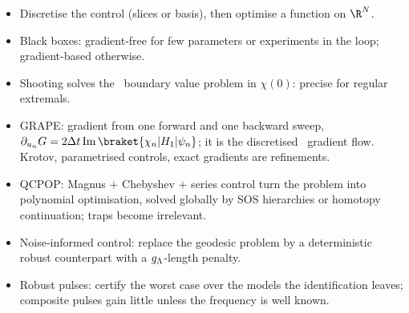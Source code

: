 \documentclass[handoutsbeamer.tex]{subfiles}
\begin{document}
\begin{frame}
\begin{itemize}\setlength\itemsep{0.2em}
    \item Discretise the control (slices or basis), then optimise a function on $\R^N$.
    \item Black boxes: gradient-free for few parameters or experiments in the loop; gradient-based otherwise.
    \item Shooting solves the \PMP\ boundary value problem in $\chi(0)$: precise for regular extremals.
    \item GRAPE: gradient from one forward and one backward sweep, $\partial_{u_n}G=2\Delta t\operatorname{Im}\braket{\chi_n|\Hctrl[1]|\psi_n}$; it is the discretised \PMP\ gradient flow. Krotov, parametrised controls, exact gradients are refinements.
    \item QCPOP: Magnus $+$ Chebyshev $+$ series control turn the problem into polynomial optimisation, solved globally by SOS hierarchies or homotopy continuation; traps become irrelevant.
    \item Noise-informed control: replace the geodesic problem by a deterministic robust counterpart with a $g_{\Lambda}$-length penalty.
    \item Robust pulses: certify the worst case over the models the identification leaves; composite pulses gain little unless the frequency is well known.
\end{itemize}
\end{frame}

\biblio
\end{document}
